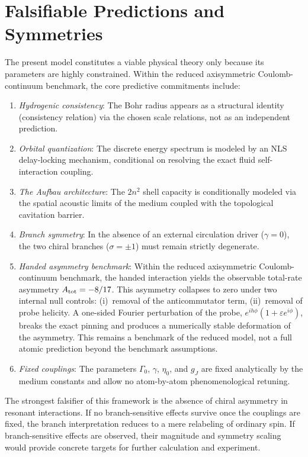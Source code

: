 \documentclass[11pt,a4paper]{article}
\begin{document}
    \section{Falsifiable Predictions and Symmetries}
    \label{sec:falsifiable}
    The present model constitutes a viable physical theory only because its parameters are highly constrained. Within the reduced axisymmetric Coulomb-continuum benchmark, the core predictive commitments include:
    \begin{enumerate}[label=(P\arabic*)]
    \item \emph{Hydrogenic consistency}: The Bohr radius appears as a structural identity (consistency relation) via the chosen scale relations, not as an independent prediction.
    \item \emph{Orbital quantization}: The discrete energy spectrum is modeled by an NLS delay-locking mechanism, conditional on resolving the exact fluid self-interaction coupling.
    \item \emph{The Aufbau architecture}: The $2n^2$ shell capacity is conditionally modeled via the spatial acoustic limits of the medium coupled with the topological cavitation barrier.
    \item \emph{Branch symmetry}: In the absence of an external circulation driver ($\gamma=0$), the two chiral branches ($\sigma = \pm 1$) must remain strictly degenerate.
    \item \emph{Handed asymmetry benchmark}: Within the reduced axisymmetric Coulomb-continuum benchmark, the handed interaction yields the observable total-rate asymmetry $A_{\rm tot}=-8/17$. This asymmetry collapses to zero under two internal null controls: (i)~removal of the anticommutator term, (ii)~removal of probe helicity. A one-sided Fourier perturbation of the probe, $e^{i h\phi}(1+\varepsilon e^{i\phi})$, breaks the exact pinning and produces a numerically stable deformation of the asymmetry. This remains a benchmark of the reduced model, not a full atomic prediction beyond the benchmark assumptions.
    \item \emph{Fixed couplings}: The parameters $\Gamma_0$, $\gamma$, $\eta_0$, and $g_J$ are fixed analytically by the medium constants and allow no atom-by-atom phenomenological retuning.
    \end{enumerate}
    
    The strongest falsifier of this framework is the absence of chiral asymmetry in resonant interactions. If no branch-sensitive effects survive once the couplings are fixed, the branch interpretation reduces to a mere relabeling of ordinary spin. If branch-sensitive effects are observed, their magnitude and symmetry scaling would provide concrete targets for further calculation and experiment.
        
\end{document}
